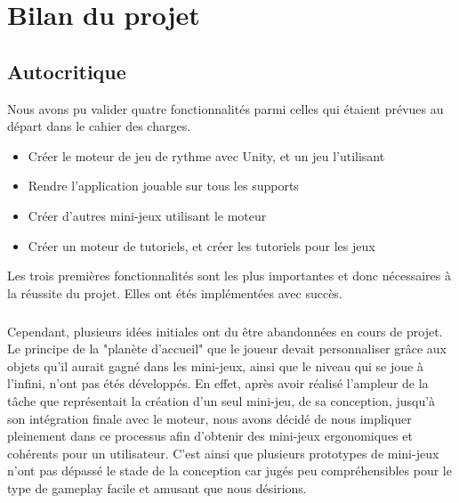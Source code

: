 \chapter{Bilan du projet}

\section{Autocritique}
Nous avons pu valider quatre fonctionnalités parmi celles qui étaient prévues au départ dans le cahier des charges.
\begin{itemize}
\item Créer le moteur de jeu de rythme avec Unity, et un jeu l'utilisant
\item Rendre l'application jouable sur tous les supports
\item Créer d'autres mini-jeux utilisant le moteur
\item Créer un moteur de tutoriels, et créer les tutoriels pour les jeux
\end{itemize}

Les trois premières fonctionnalités sont les plus importantes et donc nécessaires à la réussite du projet. Elles ont étés implémentées avec succès.

\paragraph{}
Cependant, plusieurs idées initiales ont du être abandonnées en cours de projet. Le principe de la "planète d'accueil" que le joueur devait personnaliser grâce aux objets qu'il aurait gagné dans les mini-jeux, ainsi que le niveau qui se joue à l'infini, n'ont pas étés développés. En effet, après avoir réalisé l'ampleur de la tâche que représentait la création d'un seul mini-jeu, de sa conception, jusqu'à son intégration finale avec le moteur, nous avons décidé de nous impliquer pleinement dans ce processus afin d'obtenir des mini-jeux ergonomiques et cohérents pour un utilisateur. C'est ainsi que plusieurs prototypes de mini-jeux n'ont pas dépassé le stade de la conception car jugés peu compréhensibles pour le type de gameplay facile et amusant que nous désirions.

